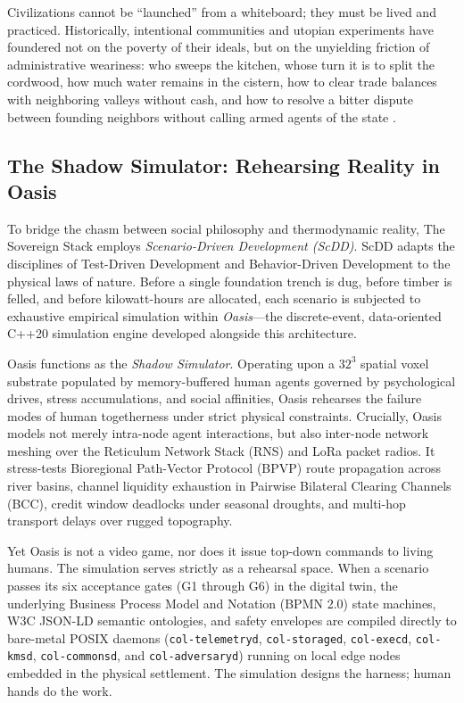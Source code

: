 Civilizations cannot be ``launched'' from a whiteboard; they must be lived and practiced. Historically, intentional communities and utopian experiments have foundered not on the poverty of their ideals, but on the unyielding friction of administrative weariness: who sweeps the kitchen, whose turn it is to split the cordwood, how much water remains in the cistern, how to clear trade balances with neighboring valleys without cash, and how to resolve a bitter dispute between founding neighbors without calling armed agents of the state \parencite{kanter1972}.

\subsection{The Shadow Simulator: Rehearsing Reality in Oasis}
To bridge the chasm between social philosophy and thermodynamic reality, The Sovereign Stack employs \textit{Scenario-Driven Development (ScDD)}. ScDD adapts the disciplines of Test-Driven Development \parencite{beck2002test} and Behavior-Driven Development \parencite{north2006introducing} to the physical laws of nature. Before a single foundation trench is dug, before timber is felled, and before kilowatt-hours are allocated, each scenario is subjected to exhaustive empirical simulation within \textit{Oasis}---the discrete-event, data-oriented C++20 simulation engine developed alongside this architecture.

Oasis functions as the \textit{Shadow Simulator}. Operating upon a $32^3$ spatial voxel substrate populated by memory-buffered human agents governed by psychological drives, stress accumulations, and social affinities, Oasis rehearses the failure modes of human togetherness under strict physical constraints. Crucially, Oasis models not merely intra-node agent interactions, but also inter-node network meshing over the Reticulum Network Stack (RNS) and LoRa packet radios. It stress-tests Bioregional Path-Vector Protocol (BPVP) route propagation across river basins, channel liquidity exhaustion in Pairwise Bilateral Clearing Channels (BCC), credit window deadlocks under seasonal droughts, and multi-hop transport delays over rugged topography.

Yet Oasis is not a video game, nor does it issue top-down commands to living humans. The simulation serves strictly as a rehearsal space. When a scenario passes its six acceptance gates (G1 through G6) in the digital twin, the underlying Business Process Model and Notation (BPMN 2.0) state machines, W3C JSON-LD semantic ontologies, and safety envelopes are compiled directly to bare-metal POSIX daemons (\texttt{col-telemetryd}, \texttt{col-storaged}, \texttt{col-execd}, \texttt{col-kmsd}, \texttt{col-commonsd}, and \texttt{col-adversaryd}) running on local edge nodes embedded in the physical settlement. The simulation designs the harness; human hands do the work.


